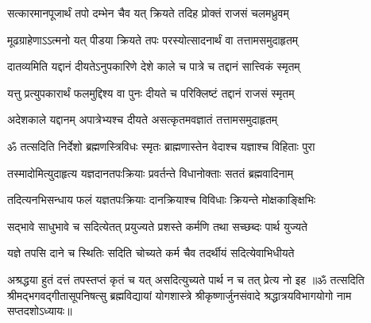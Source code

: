 \twolineshloka
{सत्कारमानपूजार्थं तपो दम्भेन चैव यत्}
{क्रियते तदिह प्रोक्तं राजसं चलमध्रुवम्}%

\twolineshloka
{मूढग्राहेणाऽऽत्मनो यत् पीडया क्रियते तपः}
{परस्योत्सादनार्थं वा तत्तामसमुदाहृतम्}%

\twolineshloka
{दातव्यमिति यद्दानं दीयतेऽनुपकारिणे}
{देशे काले च पात्रे च तद्दानं सात्त्विकं स्मृतम्}%

\twolineshloka
{यत्तु प्रत्युपकारार्थं फलमुद्दिश्य वा पुनः}
{दीयते च परिक्लिष्टं तद्दानं राजसं स्मृतम्}%

\twolineshloka
{अदेशकाले यद्दानम् अपात्रेभ्यश्च दीयते}
{असत्कृतमवज्ञातं तत्तामसमुदाहृतम्}%

\twolineshloka
{ॐ तत्सदिति निर्देशो ब्रह्मणस्त्रिविधः स्मृतः}
{ब्राह्मणास्तेन वेदाश्च यज्ञाश्च विहिताः पुरा}%

\twolineshloka
{तस्मादोमित्युदाहृत्य यज्ञदानतपःक्रियाः}
{प्रवर्तन्ते विधानोक्ताः सततं ब्रह्मवादिनाम्}%

\twolineshloka
{तदित्यनभिसन्धाय फलं यज्ञतपःक्रियाः}
{दानक्रियाश्च विविधाः क्रियन्ते मोक्षकाङ्क्षिभिः}%

\twolineshloka
{सद्भावे साधुभावे च सदित्येतत् प्रयुज्यते}
{प्रशस्ते कर्मणि तथा सच्छब्दः पार्थ युज्यते}%

\twolineshloka
{यज्ञे तपसि दाने च स्थितिः सदिति चोच्यते}
{कर्म चैव तदर्थीयं सदित्येवाभिधीयते}%

\twolineshloka
{अश्रद्धया हुतं दत्तं तपस्तप्तं कृतं च यत्}
{असदित्युच्यते पार्थ न च तत् प्रेत्य नो इह}%
{॥ॐ तत्सदिति श्रीमद्भगवद्गीतासूपनिषत्सु ब्रह्मविद्यायां योगशास्त्रे श्रीकृष्णार्जुनसंवादे श्रद्धात्रयविभागयोगो नाम सप्तदशोऽध्यायः॥}
